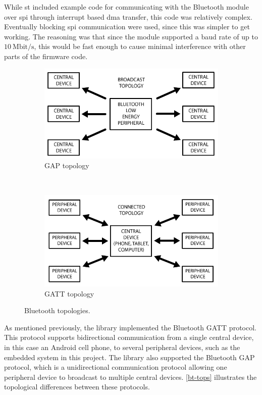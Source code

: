 While \gls{st} included example code for communicating with the Bluetooth module over \gls{spi} through interrupt based \gls{dma} transfer, this code was relatively complex. Eventually blocking \gls{spi} communication were used, since this was simpler to get working. The reasoning was that since the module supported a baud rate of up to $10~\textrm{Mbit/s}$, this would be fast enough to cause minimal interference with other parts of the firmware code.
\begin{figure}[H]
	\centering
	\begin{subfigure}[t]{0.47\textwidth}
	\includegraphics[width=\textwidth]{Figures/bt_gap.png}
	\caption{GAP topology}
	\label{bt-gap}
	\end{subfigure}
	~
	\begin{subfigure}[t]{0.47\textwidth}
	\includegraphics[width=\textwidth]{Figures/bt_gatt.png}
	\caption{ GATT topology}
	\label{bt-gatt}
	\end{subfigure}
	\caption{Bluetooth topologies.}\label{bt-tops}
\end{figure}

As mentioned previously, the library implemented the Bluetooth GATT protocol. This protocol supports bidirectional communication from a single central device, in this case an Android cell phone, to several peripheral devices, such as the embedded system in this project. The library also supported the Bluetooth GAP protocol, which is a unidirectional communication protocol allowing one peripheral device to broadcast to multiple central devices. \autoref{bt-tops} illustrates the topological differences between these protocols.

